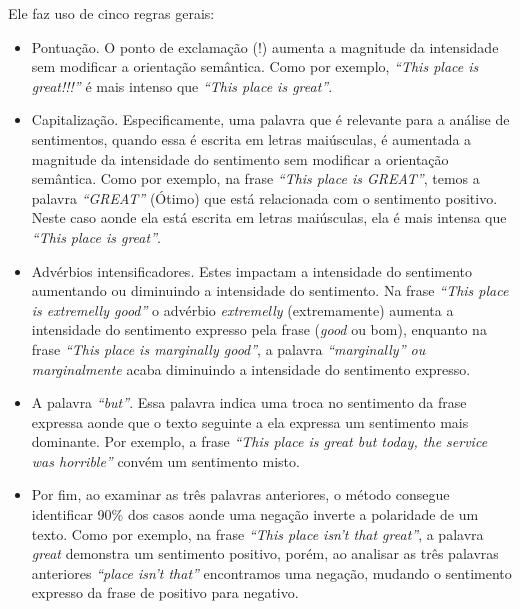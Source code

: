 Ele faz uso de cinco regras gerais:


\begin{itemize}
  \item Pontuação. O ponto de exclamação (!) aumenta a magnitude da
  intensidade sem modificar a orientação semântica. Como por exemplo,
  \textit{``This place is great!!!''} é mais intenso que \textit{``This place
  is great''}.
  \item Capitalização. Especificamente, uma palavra que é relevante para a
  análise de sentimentos, quando essa é escrita em letras maiúsculas, é
  aumentada a magnitude da intensidade do sentimento sem modificar a orientação
  semântica. Como por exemplo, na frase \textit{``This place is GREAT''}, temos
  a palavra \textit{``GREAT''} (Ótimo) que está relacionada com o sentimento
  positivo. Neste caso aonde ela está escrita em letras maiúsculas, ela é mais
  intensa que \textit{``This place is great''}.
  \item Advérbios intensificadores. Estes impactam a intensidade do sentimento
  aumentando ou diminuindo a intensidade do sentimento. Na frase \textit{``This
  place is extremelly good''} o advérbio \textit{extremelly} (extremamente)
  aumenta a intensidade do sentimento expresso pela frase (\textit{good} ou
  bom), enquanto na frase \textit{``This place is marginally good''}, a palavra
  \textit{``marginally'' ou marginalmente} acaba diminuindo a intensidade do
  sentimento expresso.
  \item A palavra \textit{``but''}. Essa palavra indica uma troca no sentimento
  da frase expressa aonde que o texto seguinte a ela expressa um sentimento mais
  dominante. Por exemplo, a frase \textit{``This place is great but today, the
  service was horrible''} convém um sentimento misto.
  \item Por fim, ao examinar as três palavras anteriores, o método consegue
  identificar 90\% dos casos aonde uma negação inverte a polaridade de um texto.
  Como por exemplo, na frase \textit{``This place isn't that great''}, a
  palavra \textit{great} demonstra um sentimento positivo, porém, ao analisar
  as três palavras anteriores \textit{``place isn't that''} encontramos uma
  negação, mudando o sentimento expresso da frase de positivo para negativo.
\end{itemize}
